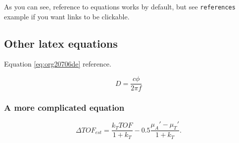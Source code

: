 As you can see, reference to equations works by default, but see \texttt{references}
example if you want links to be clickable.

\subsection{Other latex equations}
\label{sec:orge1901ac}
Equation \ref{eq:org20706de} reference.

\begin{equation}
\label{eq:org20706de}
D = \frac{c\phi}{2\pi f}
\end{equation}

\subsubsection{A more complicated equation}
\label{sec:orgaed5e4e}

\begin{equation}
\Delta TOF_{est} = \frac{k_T TOF}{1+k_T } - 0.5 \frac{\mu_A' - \mu_T'}{1+k_T}.
\end{equation}


